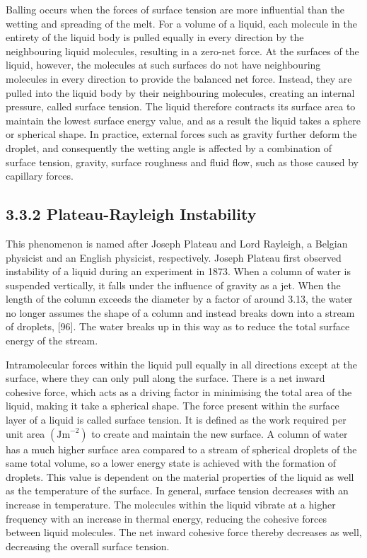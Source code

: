 \documentclass[10pt]{article}
\begin{document}
Balling occurs when the forces of surface tension are more influential than the wetting and spreading of the melt. For a volume of a liquid, each molecule in the entirety of the liquid body is pulled equally in every direction by the neighbouring liquid molecules, resulting in a zero-net force. At the surfaces of the liquid, however, the molecules at such surfaces do not have neighbouring molecules in every direction to provide the balanced net force. Instead, they are pulled into the liquid body by their neighbouring molecules, creating an internal\\
pressure, called surface tension. The liquid therefore contracts its surface area to maintain the lowest surface energy value, and as a result the liquid takes a sphere or spherical shape. In practice, external forces such as gravity further deform the droplet, and consequently the wetting angle is affected by a combination of surface tension, gravity, surface roughness and fluid flow, such as those caused by capillary forces.

\subsection*{3.3.2 Plateau-Rayleigh Instability}
This phenomenon is named after Joseph Plateau and Lord Rayleigh, a Belgian physicist and an English physicist, respectively. Joseph Plateau first observed instability of a liquid during an experiment in 1873. When a column of water is suspended vertically, it falls under the influence of gravity as a jet. When the length of the column exceeds the diameter by a factor of around 3.13, the water no longer assumes the shape of a column and instead breaks down into a stream of droplets, [96]. The water breaks up in this way as to reduce the total surface energy of the stream.

Intramolecular forces within the liquid pull equally in all directions except at the surface, where they can only pull along the surface. There is a net inward cohesive force, which acts as a driving factor in minimising the total area of the liquid, making it take a spherical shape. The force present within the surface layer of a liquid is called surface tension. It is defined as the work required per unit area $\left(\mathrm{Jm}^{-2}\right)$ to create and maintain the new surface. A column of water has a much higher surface area compared to a stream of spherical droplets of the same total volume, so a lower energy state is achieved with the formation of droplets. This value is dependent on the material properties of the liquid as well as the temperature of the surface. In general, surface tension decreases with an increase in temperature. The molecules within the liquid vibrate at a higher frequency with an increase in thermal energy, reducing the cohesive forces between liquid molecules. The net inward cohesive force thereby decreases as well, decreasing the overall surface tension.
\end{document}
